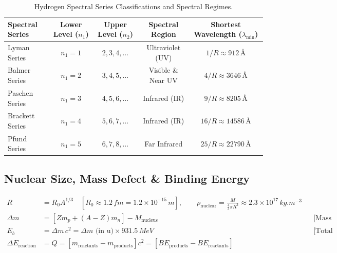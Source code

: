 \documentclass[11pt,a4paper]{article}
\begin{document}
\begin{table}[htbp]
\centering
\small
\renewcommand{\arraystretch}{1.2}
\begin{tabularx}{\textwidth}{L c c c c}
\toprule
\textbf{Spectral Series} & \textbf{Lower Level ($n_1$)} & \textbf{Upper Level ($n_2$)} & \textbf{Spectral Region} & \textbf{Shortest Wavelength ($\lambda_{\min}$)} \\
\midrule
Lyman Series & $n_1 = 1$ & $2, 3, 4, \dots$ & Ultraviolet (UV) & $1/R \approx 912\,\text{\AA}$ \\
Balmer Series & $n_1 = 2$ & $3, 4, 5, \dots$ & Visible \& Near UV & $4/R \approx 3646\,\text{\AA}$ \\
Paschen Series & $n_1 = 3$ & $4, 5, 6, \dots$ & Infrared (IR) & $9/R \approx 8205\,\text{\AA}$ \\
Brackett Series & $n_1 = 4$ & $5, 6, 7, \dots$ & Infrared (IR) & $16/R \approx 14586\,\text{\AA}$ \\
Pfund Series & $n_1 = 5$ & $6, 7, 8, \dots$ & Far Infrared & $25/R \approx 22790\,\text{\AA}$ \\
\bottomrule
\end{tabularx}
\caption{Hydrogen Spectral Series Classifications and Spectral Regimes.}
\end{table}

\subsection{Nuclear Size, Mass Defect \& Binding Energy}

\begin{formulabox}
\begin{align}
  R &= R_0 A^{1/3} \quad [R_0 \approx 1.2\,\si{fm} = 1.2\times 10^{-15}\,\si{m}], \qquad \rho_{\text{nuclear}} = \frac{M}{\frac{4}{3}\pi R^3} \approx 2.3\times 10^{17}\,\si{kg.m^{-3}} \\
  \Delta m &= [Z m_p + (A - Z)m_n] - M_{\text{nucleus}} && \text{[Mass Defect]} \\
  E_b &= \Delta m\,c^2 = \Delta m\text{ (in u)}\times 931.5\,\si{MeV} && \text{[Total Binding Energy]} \\
  \Delta E_{\text{reaction}} &= Q = [m_{\text{reactants}} - m_{\text{products}}]c^2 = [BE_{\text{products}} - BE_{\text{reactants}}]
\end{align}
\end{formulabox}
\end{document}
